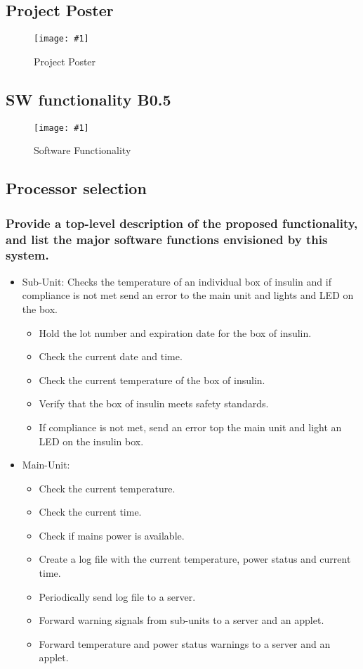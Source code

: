 \documentclass[12pt]{article} \usepackage{jeep} \usepackage{unicode}
\newcommand\createfigure[2]{
  \begin{figure}[H]
    \centering \texttt{[image: \#1]}
    \caption{#2}
  \end{figure}}
\begin{document}
\subsection{Project Poster}
\createfigure{../Figures/project-poster.jpg}{Project Poster}
\subsection{SW functionality B0.5}
\createfigure{../Figures/SW functionality B0.5.jpg}{Software Functionality}
\subsection{Processor selection}
\subsubsection{Provide a top-level description of the proposed functionality,
  and list the major software functions envisioned by this system.}
\begin{itemize}
  \item Sub-Unit: Checks the temperature of an individual box of insulin and if
        compliance is not met send an error to the main unit and lights and LED
        on the box.
        \begin{itemize}
          \item Hold the lot number and expiration date for the box of insulin.
          \item Check the current date and time.
          \item Check the current temperature of the box of insulin.
          \item Verify that the box of insulin meets safety standards.
          \item If compliance is not met, send an error top the main unit and
                light an LED on the insulin box.
        \end{itemize}
  \item Main-Unit:
        \begin{itemize}
          \item Check the current temperature.
          \item Check the current time.
          \item Check if mains power is available.
          \item Create a log file with the current temperature, power status and
                current time.
          \item Periodically send log file to a server.
          \item Forward warning signals from sub-units to a server and an
                applet.
          \item Forward temperature and power status warnings to a server and an
                applet.
        \end{itemize}
\end{itemize}
\end{document}
